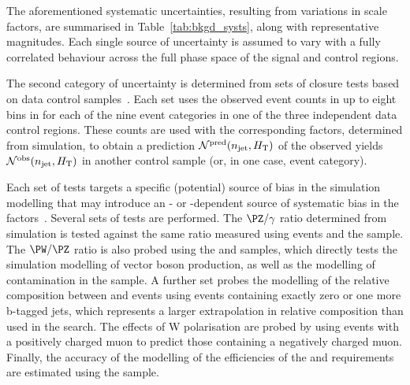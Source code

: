 The aforementioned systematic uncertainties, resulting from variations
in scale factors, are summarised in Table~\ref{tab:bkgd_systs}, along
with representative magnitudes. Each single source of uncertainty is
assumed to vary with a fully correlated behaviour across the full
phase space of the signal and control regions.

The second category of uncertainty is determined from sets of closure
tests based on data control samples~\cite{RA1Paper2012}. Each set uses
the observed event counts in up to eight bins in \scalht for each of
the nine \njet event categories in one of the three independent data
control regions. These counts are used with the corresponding \tf
factors, determined from simulation, to obtain a prediction
$\mathcal{N}^\text{pred}(n_{\text{jet}}, H_{\mathrm{T}})$ of the observed yields
$\mathcal{N}^\text{obs}(n_{\text{jet}}, H_{\mathrm{T}})$ in another control sample
(or, in one case, \nb event category).

Each set of tests targets a specific (potential) source of bias in the
simulation modelling that may introduce an \njet- or \scalht-dependent
source of systematic bias in the \tf factors~\cite{RA1Paper2012}. Several
sets of tests are performed. The $\PZ/\gamma$ ratio determined from
simulation is tested against the same ratio measured using \zmumuj
events and the \gj sample.
The $\PW/\PZ$ ratio is also probed using the \mj and \mmj
samples, which directly tests the simulation modelling of vector
boson production, as well as the modelling of \ttbar contamination in
the \mj sample.
A further set probes the modelling of the relative composition between
\wlj and \ttbar events using \mj events containing exactly zero or one
more b-tagged jets, which represents a larger extrapolation in
relative composition than used in the search.  The effects of W
polarisation are probed by using \mj events with a positively charged
muon to predict those containing a negatively charged muon. Finally,
the accuracy of the modelling of the efficiencies of the \alphat and
\bdphi requirements are estimated using the \mj sample.

